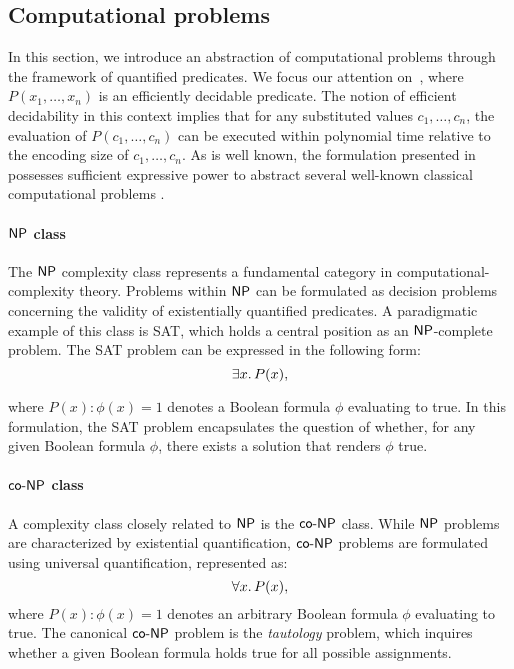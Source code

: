 \subsection{Computational problems}\label{sec:comp}
In this section, we introduce an abstraction of computational problems through the framework of quantified predicates. We focus our attention on~, where $P(x_1, \ldots, x_n)$ is an efficiently decidable predicate. The notion of efficient decidability in this context implies that for any substituted values $c_1, \ldots, c_n$, the evaluation of $P(c_1, \ldots, c_n)$ can be executed within polynomial time relative to the encoding size of $c_1, \ldots, c_n$.
As is well known,
the formulation presented in  possesses sufficient expressive power to abstract several well-known classical computational problems
\cite{DBLP:books/daglib/0095988}.

\paragraph{$\mathsf{NP}$ class}The $\mathsf{NP}$ complexity class represents a fundamental category in computational-complexity theory. Problems within $\mathsf{NP}$ can be formulated as decision problems concerning the validity of existentially quantified predicates. A paradigmatic example of this class is SAT, which holds a central position as an $\mathsf{NP}$-complete problem. The SAT problem can be expressed in the following form:
\begin{equation}\label{eq:np}
   \exists x\ldotp P(x), 
\end{equation}

where $P(x): \phi(x)=1$ denotes a Boolean formula $\phi$ evaluating to true. In this formulation, the SAT problem encapsulates the question of whether, for any given Boolean formula $\phi$, there exists a solution that renders $\phi$ true.

\paragraph{$\mathsf{co{\text -}NP}$ class}A complexity class closely related to $\mathsf{NP}$ is the $\mathsf{co{\text -}NP}$ class. While $\mathsf{NP}$ problems are characterized by existential quantification, $\mathsf{co{\text -}NP}$ problems are formulated using universal quantification, represented as:
\[
\forall x\ldotp P(x),
\]
where $P(x): \phi(x)=1$ denotes an arbitrary Boolean formula $\phi$ evaluating to true. The canonical $\mathsf{co{\text -}NP}$ problem is the \emph{tautology} problem, which inquires whether a given Boolean formula holds true for all possible assignments. %

